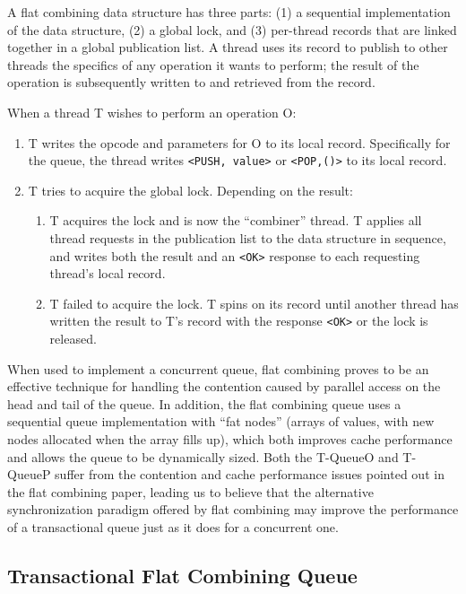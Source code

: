 A flat combining data structure has three parts: (1) a sequential implementation of the data structure, (2) a global lock, and (3) per-thread records that are linked together in a global publication list. A thread uses its record to publish to other threads the specifics of any operation it wants to perform; the result of the operation is subsequently written to and retrieved from the record.

When a thread T wishes to perform an operation O:
\begin{enumerate}
    \item T writes the opcode and parameters for O to its local record. Specifically for the queue, the thread writes \texttt{<PUSH, value>} or \texttt{<POP,()>} to its local record.
   \item T tries to acquire the global lock. Depending on the result:
   \begin{enumerate}
        \item T acquires the lock and is now the “combiner” thread. T applies all thread requests in the publication list to the data structure in sequence, and writes both the result and an \texttt{<OK>} response to each requesting thread's local record.
        \item T failed to acquire the lock. T spins on its record until another thread has written the result to T's record with the response \texttt{<OK>} or the lock is released. 
    \end{enumerate}
\end{enumerate}

When used to implement a concurrent queue, flat combining proves to be an effective technique for handling the contention caused by parallel access on the head and tail of the queue. In addition, the flat combining queue uses a sequential queue implementation with ``fat nodes'' (arrays of values, with new nodes allocated when the array fills up), which both improves cache performance and allows the queue to be dynamically sized. Both the T-QueueO and T-QueueP suffer from the contention and cache performance issues pointed out in the flat combining paper, leading us to believe that the alternative synchronization paradigm offered by flat combining may improve the performance of a transactional queue just as it does for a concurrent one.

\subsection{Transactional Flat Combining Queue} 
\label{fcqueuet}

